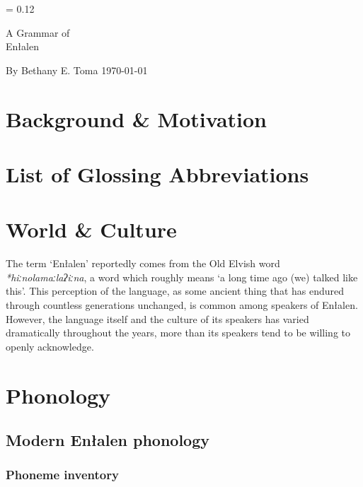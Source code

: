 \documentclass[a4paper,11pt,oneside,openany]{memoir}
\newcommand{\proto}[1]{\textit{*#1}}
\newlength{\drop}%
\newcommand*{\titleP}{\begingroup%
\drop = 0.12\textheight
\vspace*{\drop}
\begin{center}
{\huge A Grammar of}\\[\baselineskip]
{\HUGE\sc \lang}\par
\end{center}
\vspace*{3\drop}
{\large By {\sc Bethany E. Toma}}
\vfill
{\today}
\vspace*{0.5\drop}
\endgroup}
\newcommand{\lang}{Enłalen}
\newcommand{\parentlang}{Old Elvish}
\begin{document}
\begin{titlingpage}
\titleP
\end{titlingpage}
\frontmatter

\chapter{Background \& Motivation}
\clearpage
\tableofcontents

\chapter{List of Glossing Abbreviations}

\mainmatter

\chapter{World \& Culture}

The term `\lang{}' reportedly comes from the \parentlang{} word \proto{hiːnolamaːlaʔiːna}, a word which roughly means `a long time ago (we) talked like this'. This perception of the language, as some ancient thing that has endured through countless generations unchanged, is common among speakers of \lang{}. However, the language itself and the culture of its speakers has varied dramatically throughout the years, more than its speakers tend to be willing to openly acknowledge.

\chapter{Phonology}

\section{Modern \lang{} phonology}

\subsection{Phoneme inventory}
\end{document}
